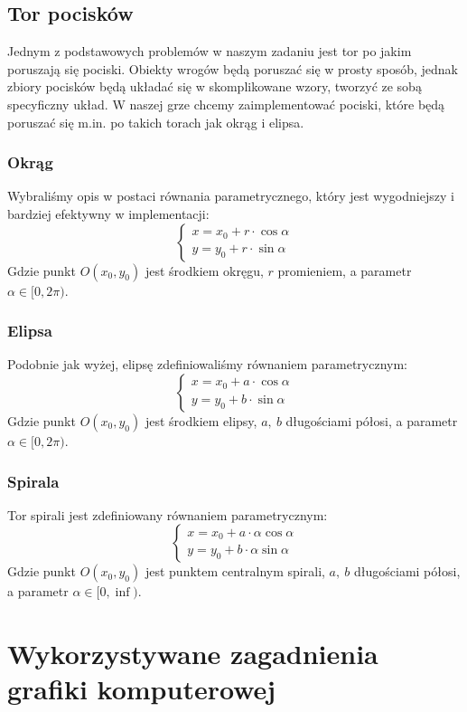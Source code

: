 \documentclass[a4paper,twoside]{article}
\begin{document}
		
		\newpage
		\subsection{Tor pocisków}
			Jednym z podstawowych problemów w naszym zadaniu jest tor po jakim poruszają się pociski. Obiekty wrogów będą poruszać się w prosty sposób, jednak zbiory pocisków będą układać się w skomplikowane wzory, tworzyć ze sobą specyficzny układ. W naszej grze chcemy zaimplementować pociski, które będą poruszać się m.in. po takich torach jak okrąg i elipsa.\\
		
		\subsubsection{Okrąg}
			Wybraliśmy opis w postaci równania parametrycznego, który jest wygodniejszy i bardziej efektywny w implementacji:
			$$
				\begin{cases}
					x=x_0+r\cdot \cos{\alpha}\\
					y=y_0+r\cdot \sin{\alpha}
				\end{cases}
			$$
			Gdzie punkt $ O(x_0, y_0) $ jest środkiem okręgu, $ r $ promieniem, a parametr $ \alpha \in [0, 2\pi ) $.
		\subsubsection{Elipsa}
			Podobnie jak wyżej, elipsę zdefiniowaliśmy równaniem parametrycznym:
			$$
				\begin{cases}
					x=x_0+a\cdot \cos{\alpha}\\
					y=y_0+b\cdot \sin{\alpha}
				\end{cases}
			$$
			Gdzie punkt $ O(x_0, y_0) $ jest środkiem elipsy, $ a,\:b $ długościami półosi, a parametr $ \alpha \in [0, 2\pi ) $.
		\subsubsection{Spirala}
			Tor spirali jest zdefiniowany równaniem parametrycznym:
			$$
				\begin{cases}
					x=x_0+a\cdot \alpha \cos{\alpha}\\
					y=y_0+b\cdot \alpha \sin{\alpha}
				\end{cases}
			$$
			Gdzie punkt $ O(x_0, y_0) $ jest punktem centralnym spirali, $ a,\:b $ długościami półosi, a parametr $ \alpha \in [0, \inf ) $.
		
	\newpage
	\section{Wykorzystywane zagadnienia grafiki komputerowej}
\end{document}
